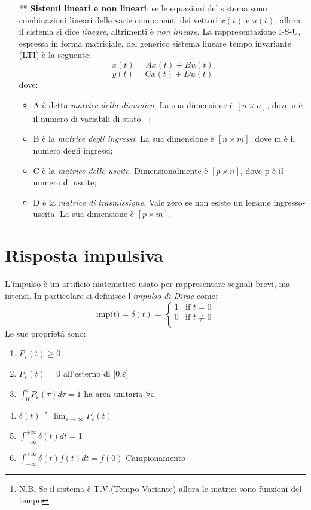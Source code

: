 \documentclass[a4paper]{report}
\begin{document}
\begin{itemize}
\item[**]{\textbf{Sistemi lineari e non lineari}}: se le equazioni del
  sistema sono combinazioni lineari delle varie
componenti dei vettori $x(t)$ e $u(t)$, allora il sistema si dice
\emph{lineare}, altrimenti \`e \emph{non lineare}. La rappresentazione
I-S-U, espressa in forma matriciale, del generico sistema lineare
tempo invariante (LTI) \`e la seguente: 
\begin{equation}\label{eq:matltisys}
  \dot{x}(t)=Ax(t)+Bu(t)
\end{equation}
\begin{equation}
  y(t)=Cx(t)+Du(t)
\end{equation}
dove:
\begin{itemize}
\item {A \`e detta \emph{matrice della dinamica}. La sua dimensione
  \`e $[n \times n]$, dove n \`e il numero di variabili di
  stato}~\footnote{N.B. Se il sistema \`e T.V.(Tempo Variante) allora
  le matrici sono funzioni del tempo};
\item{B \`e la \emph{matrice degli ingressi}. La sua dimensione \`e
  $[n\times m]$, dove m \`e il numero degli ingressi};
\item{C \`e la \emph{matrice delle uscite}. Dimensionalmente \`e
  $[p\times n]$, dove p \`e il numero di uscite};
\item{D \`e la \emph{matrice di trasmissione}. Vale zero se
  non esiste un legame ingresso-uscita. La sua dimensione \`e
  $[p\times m]$}.
\end{itemize}
\end{itemize}

\section{Risposta impulsiva}
L'impulso \`e un artificio matematico usato per rappresentare segnali
brevi, ma intensi. In particolare si definisce l'\emph{impulso di
  Dirac} come:
\begin{displaymath}
\textrm{imp(t)}=\delta(t) = \left\{ \begin{array}{ll}
 1 & \textrm{if $t=0$}\\
 0 & \textrm{if $t\neq0$}\\
  \end{array} \right.
\end{displaymath}
Le sue propriet\`a sono:
\begin{enumerate}
\item {$P_\varepsilon(t)\ge 0$}
\item {$P_\varepsilon(t)=0$} all'esterno di [0,$\varepsilon$]
\item{$\int_{0}^{\varepsilon}P_\varepsilon(\tau) d\tau=1$} ha area
  unitaria $\forall \varepsilon$ 
\item{$\delta(t)\triangleq  \lim_{\varepsilon \rightarrow \infty}
  P_\varepsilon(t) $} 
\item{$\int_{-\infty}^{+\infty}\delta(t)dt=1$}
\item {$\int_{-\infty}^{+\infty}\delta(t)f(t)dt=f(0)$ Campionamento}
\end{enumerate}
\end{document}
